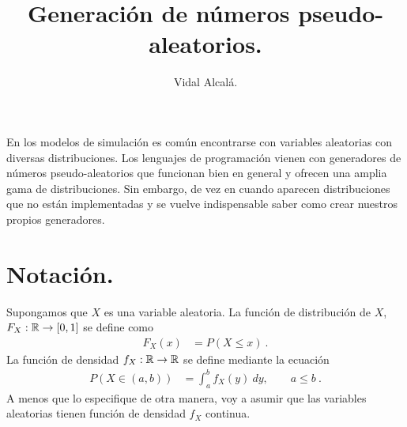 \documentclass[12pt,reqno]{amsart}\usepackage[]{graphicx}\usepackage[]{color}
\title{Generación de números pseudo-aleatorios.}
\author{Vidal Alcalá.}
\begin{document}
\maketitle

En los modelos de simulación es común encontrarse con variables aleatorias con diversas distribuciones. Los lenguajes de programación vienen con generadores de números pseudo-aleatorios que funcionan bien en general y ofrecen una amplia gama de distribuciones. Sin embargo, de vez en cuando aparecen distribuciones que no están implementadas y se vuelve indispensable saber como crear nuestros propios generadores.

\section{Notación.}
Supongamos que $X$ es una variable aleatoria. La función de distribución de $X$, $F_{X}:\mathbb{R}\to [0,1]$ se define como
\begin{equation}
  \begin{split}
  F_{X}(x) &= P(X\leq x) \:.
	\end{split}
\end{equation}
La función de densidad $f_{X}:\mathbb{R} \to \mathbb{R} $ se define mediante la ecuación
\begin{equation}
  \begin{split}
  P( X\in (a,b) ) &= \int_{a}^{b}f_X(y)\:dy,\qquad a\leq b\:.
  \end{split}
\end{equation}
A menos que lo especifique de otra manera, voy a asumir que las variables aleatorias tienen función de densidad $f_X$ continua.
\end{document}
